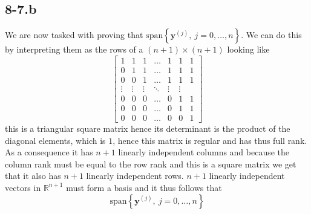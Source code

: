 \documentclass{article}
\begin{document}
\subsection*{8-7.b}
We are now tasked with proving that $\text{span}\left\{\mathbf{y}^{\left(j\right)}, \: j = 0,\dots, n\right\}$. We can do this by interpreting them as the rows of a $\left(n+1\right) \times \left(n+1\right)$ looking like
\begin{equation*}
    \begin{bmatrix}
    1 & 1 & 1 & \dots & 1 & 1  & 1\\
    0 & 1 & 1 & \dots & 1 & 1 & 1 \\
    0 & 0 & 1 & \dots & 1 & 1 & 1 \\
    \vdots  & \vdots & \vdots & \ddots & \vdots & \vdots \\
    0 & 0 & 0 &  \dots & 0 & 1 & 1 \\
    0 & 0 & 0 &  \dots & 0 & 1 & 1 \\
    0 & 0 & 0 &  \dots & 0 & 0 & 1
    \end{bmatrix}
\end{equation*}
this is a triangular square matrix hence its determinant is the product of the diagonal elements, which is $1$, hence this matrix is regular and has thus full rank. As a consequence it has $n+1$ linearly independent columns and because the column rank must be equal to the row rank and this is a square matrix we get that it also has $n+1$ linearly independent rows. $n+1$ linearly independent vectors in $\mathbb{R}^{n+1}$ must form a basis and it thus follows that
\begin{equation*}
    \text{span}\left\{\mathbf{y}^{\left(j\right)}, \: j = 0,\dots, n\right\}
\end{equation*}
\end{document}

